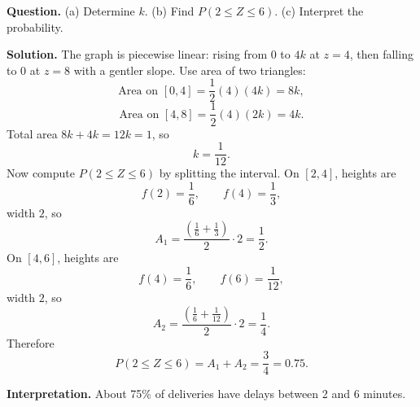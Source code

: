 \begin{ExamProblems}
\textbf{Question.}
(a) Determine $k$. (b) Find $P(2\le Z\le 6)$. (c) Interpret the probability.

\textbf{Solution.}
The graph is piecewise linear: rising from 0 to $4k$ at $z=4$, then falling to 0 at $z=8$ with a gentler slope.
Use area of two triangles:
\[
\text{Area on }[0,4]=\frac12(4)(4k)=8k,
\]
\[
\text{Area on }[4,8]=\frac12(4)(2k)=4k.
\]
Total area $8k+4k=12k=1$, so
\[
k=\frac{1}{12}.
\]
Now compute $P(2\le Z\le 6)$ by splitting the interval.
On $[2,4]$, heights are
\[
f(2)=\frac{1}{6},\qquad f(4)=\frac{1}{3},
\]
width $2$, so
\[
A_1=\frac{\left(\frac16+\frac13\right)}{2}\cdot 2=\frac12.
\]
On $[4,6]$, heights are
\[
f(4)=\frac{1}{6},\qquad f(6)=\frac{1}{12},
\]
width $2$, so
\[
A_2=\frac{\left(\frac16+\frac{1}{12}\right)}{2}\cdot 2=\frac14.
\]
Therefore
\[
P(2\le Z\le 6)=A_1+A_2=\frac34=0.75.
\]

\textbf{Interpretation.}
About 75\% of deliveries have delays between 2 and 6 minutes.

\end{ExamProblems}

